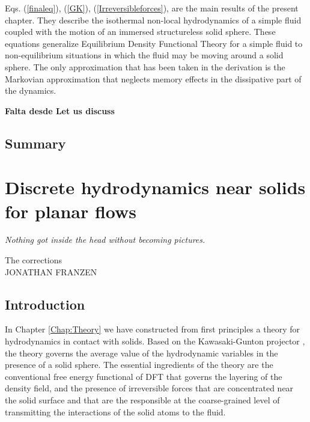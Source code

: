 \documentclass[b5paper,openright,11pt]{book}
\newcommand{\Note}[1]{{\bf \color{red}#1}}    %
\begin{document}
Eqs.   (\ref{finaleq}), (\ref{GK}),   (\ref{Irreversibleforces}), 
are the  main results of the present  chapter.  They describe
the isothermal non-local  hydrodynamics of a  simple fluid coupled with
the motion of an immersed structureless solid sphere.  These equations
generalize Equilibrium Density Functional Theory for a simple fluid to
non-equilibrium situations in  which the fluid may be  moving around a
solid  sphere.  The  only approximation  that  has been  taken in  the
derivation is the Markovian approximation that neglects memory effects
in the dissipative part of the dynamics.

\Note{Falta desde Let us discuss}

\section{Summary}


\chapter{Discrete hydrodynamics near solids for planar flows}\label{Chap:Planar}
\epigraph{\textit{Nothing got inside the head without becoming pictures.}}{The corrections \\ JONATHAN FRANZEN}
\section{Introduction}
In Chapter \ref{Chap:Theory} we  have constructed  from  first
principles a theory  for hydrodynamics in contact with  solids.    Based   on    the   Kawasaki-Gunton   projector
\cite{Kawasaki1973,Grabert1982}, the theory  governs the average value
of the hydrodynamic variables in the  presence of a solid sphere.  The
essential ingredients of  the theory are the  conventional free energy
functional of DFT that governs the  layering of the density field, and
the presence  of irreversible  forces that  are concentrated  near the
solid surface and that are the responsible at the coarse-grained level
of transmitting the  interactions of the solid atoms to  the fluid. 
\end{document}
